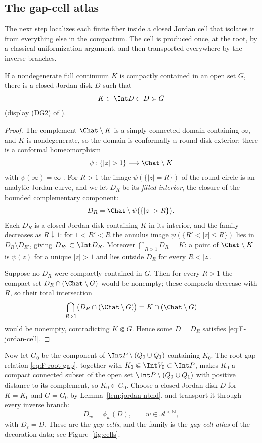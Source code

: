 \subsection{The gap-cell atlas}\label{subsec:F-atlas}

The next step localizes each finite fiber inside a closed Jordan cell
that isolates it from everything else in the compactum.  The cell is
produced once, at the root, by a classical uniformization argument, and
then transported everywhere by the inverse branches.

\begin{lemma}\label{lem:jordan-nbhd}
If a nondegenerate full continuum $K$ is compactly contained in an open
set $G$, there is a closed Jordan disk $D$ such that
\begin{equation}\label{eq:F-jordan-cell}
K\subset\Int D\subset D\Subset G
\end{equation}
(display (DG2) of \cite{MWman}).
\end{lemma}

\begin{proof}
The complement $\Chat\setminus K$ is a simply connected domain containing
$\infty$, and $K$ is nondegenerate, so the domain is conformally a
round-disk exterior: there is a conformal homeomorphism
\[
\psi\colon\{|z|>1\}\longrightarrow\Chat\setminus K
\]
with $\psi(\infty)=\infty$ \cite{Pom92}.  For $R>1$ the image
$\psi(\{|z|=R\})$ of the round circle is an analytic Jordan curve, and we
let $D_R$ be its \emph{filled interior}, the closure of the bounded
complementary component:
\[
D_R=\Chat\setminus\psi\bigl(\{|z|>R\}\bigr).
\]
Each $D_R$ is a closed Jordan disk containing $K$ in its interior, and
the family decreases as $R\downarrow1$: for $1<R'<R$ the annulus image
$\psi(\{R'<|z|\le R\})$ lies in $D_{R}\setminus D_{R'}$, giving
$D_{R'}\subset\Int D_R$.  Moreover $\bigcap_{R>1}D_R=K$: a point of
$\Chat\setminus K$ is $\psi(z)$ for a unique $|z|>1$ and lies outside
$D_R$ for every $R<|z|$.

Suppose no $D_R$ were compactly contained in $G$.  Then for every $R>1$
the compact set $D_R\cap(\Chat\setminus G)$ would be nonempty; these
compacta decrease with $R$, so their total intersection
\[
\bigcap_{R>1}\bigl(D_R\cap(\Chat\setminus G)\bigr)
=K\cap(\Chat\setminus G)
\]
would be nonempty, contradicting $K\Subset G$.  Hence some $D=D_R$
satisfies \eqref{eq:F-jordan-cell}.
\end{proof}

Now let $G_0$ be the component of $\Int P\setminus(Q_0\cup Q_1)$
containing $K_0$.  The root-gap relation \eqref{eq:F-root-gap}, together
with $K_0\Subset\Int V_0\subset\Int P$, makes $K_0$ a compact connected
subset of the open set $\Int P\setminus(Q_0\cup Q_1)$ with positive
distance to its complement, so $K_0\Subset G_0$.  Choose a closed Jordan
disk $D$ for $K=K_0$ and $G=G_0$ by Lemma~\ref{lem:jordan-nbhd}, and
transport it through every inverse branch:
\[
D_w=\phi_w(D),\qquad w\in\mathcal A^{<\mathbb N},
\]
with $D_\varepsilon=D$.  These are the \emph{gap cells}, and the family
is the \emph{gap-cell atlas} of the decoration data; see
Figure~\ref{fig:cells}.

